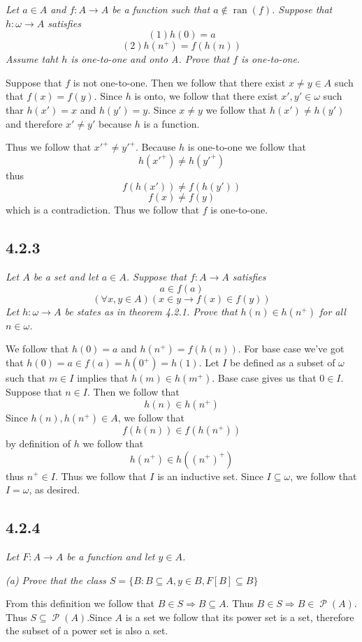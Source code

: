 \documentclass[11pt,oneside,titlepage]{book}
\DeclareMathOperator \pow {\mathcal {P}}
\DeclareMathOperator \ra {\Rightarrow}
\DeclareMathOperator \ran {ran}
\begin{document}
\textit{Let $a \in A$ and $f: A \to A$ be a function such that $a \notin \ran(f)$. Suppose that
  $h: \omega \to A$ satisfies
  $$(1) h(0) = a$$
  $$(2) h(n^+) = f(h(n))$$
  Assume taht $h$ is one-to-one and onto A. Prove that $f$ is one-to-one.
}

Suppose that $f$ is not one-to-one. Then we follow that there exist $x \neq y \in A$
such that $f(x) = f(y)$. Since $h$ is onto, we follow that there exist $x', y' \in \omega$
such thar $h(x') = x$ and $h(y') = y$. Since $x \neq y$ we follow that $h(x') \neq h(y')$
and therefore $x' \neq y'$ because $h$ is a function.

Thus we follow that $x'^+ \neq y'^+$. Because $h$ is one-to-one we follow that
$$h(x'^+) \neq  h(y'^+)$$
thus
$$f(h(x')) \neq  f(h(y'))$$
$$f(x) \neq  f(y)$$
which is a contradiction. Thus we follow that $f$ is one-to-one.

\subsection*{4.2.3}

\textit{Let $A$ be a set and let $a \in A$. Suppose that $f: A \to A$ satisfies 
$$a \in f(a)$$
$$(\forall x, y \in A)(x \in y \to f(x) \in f(y))$$
Let $h: \omega \to A$ be states as in theorem 4.2.1. Prove that $h(n) \in h(n^+)$ for
all $n \in \omega$.}

We follow that $h(0) = a$ and $h(n^+) = f(h(n))$. For base case we've got that
$h(0) = a \in f(a) = h(0^+) = h(1)$.
Let $I$ be defined as a subset of $\omega$  such that $m \in I$ implies
that $h(m) \in h(m^+)$. Base case gives us that $0 \in I$. Suppose that
$n \in I$. Then we follow that
$$h(n) \in h(n^+)$$
Since $h(n), h(n^+) \in A$, we follow that
$$f(h(n)) \in f(h(n^+))$$
by definition of $h$ we follow that
$$h(n^+) \in h((n^+)^+)$$
thus $n^+ \in I$. Thus we follow that $I$ is an inductive set. Since $I \subseteq \omega$,
we follow that $I = \omega$, as desired.

\subsection*{4.2.4}

\textit{Let $F: A \to A$ be a function and let $y \in A$.}

\textit{(a) Prove that the class $S = \{B: B \subseteq A, y \in B, F[B] \subseteq B\}$}

From this definition we follow that $B \in S \ra B \subseteq A$. Thus $B \in S \ra
B \in \pow(A)$. Thus $S \subseteq \pow(A)$.Since $A$ is a set we follow that its power set is a set,
therefore the subset of a power set is also a set.
\end{document}
